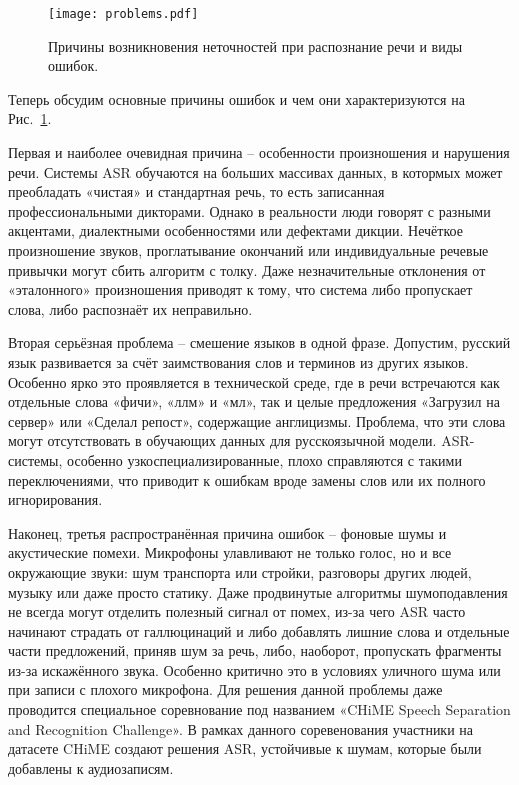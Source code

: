 \begin{figure}[!t]
  \centering
  \texttt{[image: problems.pdf]}
  \caption{Причины возникновения неточностей при распознание речи и виды ошибок.}
  \label{fig:problems}
\end{figure}

Теперь обсудим основные причины ошибок и чем они характеризуются на Рис.~\ref{fig:problems}.

Первая и наиболее очевидная причина -- особенности произношения и нарушения речи.
Системы ASR обучаются на больших массивах данных, в котормых может преобладать «чистая» и стандартная речь, то есть записанная профессиональными дикторами.
Однако в реальности люди говорят с разными акцентами, диалектными особенностями или дефектами дикции.
Нечёткое произношение звуков, проглатывание окончаний или индивидуальные речевые привычки могут сбить алгоритм с толку.
Даже незначительные отклонения от «эталонного» произношения приводят к тому, что система либо пропускает слова, либо распознаёт их неправильно.

Вторая серьёзная проблема -- смешение языков в одной фразе.
Допустим, русский язык развивается за счёт заимствования слов и терминов из других языков.
Особенно ярко это проявляется в технической среде, где в речи встречаются как отдельные слова «фичи», «ллм» и «мл», так и целые предложения «Загрузил на сервер» или «Сделал репост», содержащие англицизмы.
Проблема, что эти слова могут отсутствовать в обучающих данных для русскоязычной модели.
ASR-системы, особенно узкоспециализированные, плохо справляются с такими переключениями, что приводит к ошибкам вроде замены слов или их полного игнорирования.

Наконец, третья распространённая причина ошибок -- фоновые шумы и акустические помехи.
Микрофоны улавливают не только голос, но и все окружающие звуки: шум транспорта или стройки, разговоры других людей, музыку или даже просто статику.
Даже продвинутые алгоритмы шумоподавления не всегда могут отделить полезный сигнал от помех, из-за чего ASR часто начинают страдать от галлюцинаций и либо добавлять лишние слова и отдельные части предложений, приняв шум за речь, либо, наоборот, пропускать фрагменты из-за искажённого звука.
Особенно критично это в условиях уличного шума или при записи с плохого микрофона.
Для решения данной проблемы даже проводится специальное соревнование под названием «CHiME Speech Separation and Recognition Challenge».
В рамках данного соревенования участники на датасете CHiME создают решения ASR, устойчивые к шумам, которые были добавлены к аудиозаписям.

